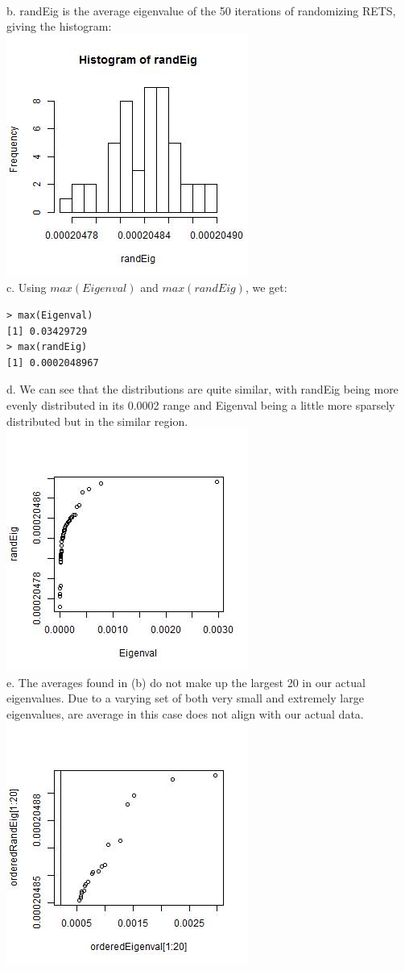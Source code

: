 \documentclass[12pt]{article}
\begin{document}
\\b. randEig is the average eigenvalue of the 50 iterations of randomizing RETS, giving the histogram: \\
\includegraphics{eighist3.jpeg} \\
\newpage
c. Using $max(Eigenval)$ and $max(randEig)$, we get:
\begin{lstlisting}
> max(Eigenval)
[1] 0.03429729
> max(randEig)
[1] 0.0002048967
\end{lstlisting}
\hfill \break
d. We can see that the distributions are quite similar, with randEig being more evenly distributed in its 0.0002 range and Eigenval being a little more sparsely distributed but in the similar region.
\includegraphics[scale = .8]{qqplot.jpeg}
\centering
\\
e. The averages found in (b) do not make up the largest 20 in our actual eigenvalues. Due to a varying set of both very small and extremely large eigenvalues, are average in this case does not align with our actual data. \\
\includegraphics[scale = .8]{eigscatter.jpeg}
\centering
\end{document}
